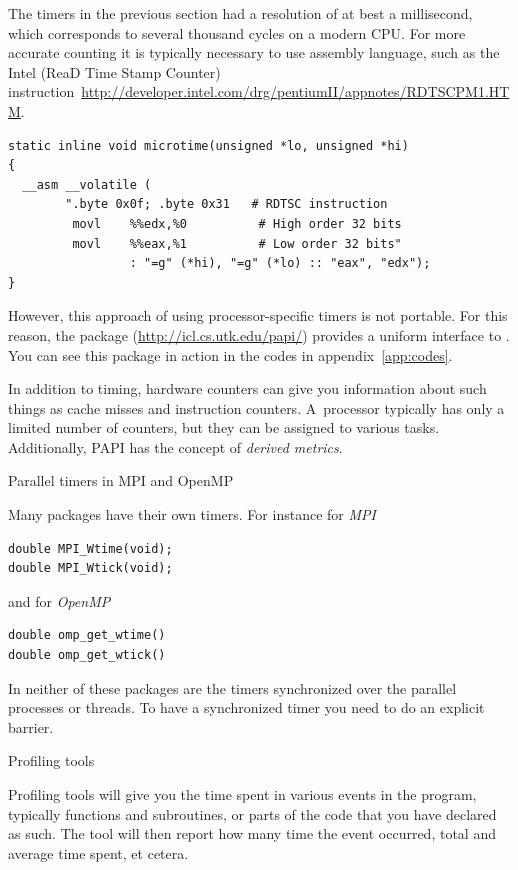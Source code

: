 The timers in the previous section had a resolution of at best a
millisecond, which corresponds to several thousand cycles on a modern
CPU. For more accurate counting it is typically necessary to use
assembly language, such as the Intel  (ReaD Time Stamp
Counter)
instruction~\url{http://developer.intel.com/drg/pentiumII/appnotes/RDTSCPM1.HTM}.
\begin{verbatim}
static inline void microtime(unsigned *lo, unsigned *hi)
{
  __asm __volatile (
        ".byte 0x0f; .byte 0x31   # RDTSC instruction
         movl    %%edx,%0          # High order 32 bits
         movl    %%eax,%1          # Low order 32 bits"
                 : "=g" (*hi), "=g" (*lo) :: "eax", "edx");
}                                                
\end{verbatim}
However,
this approach of using processor-specific timers is not portable. For
this reason, the  package (\url{http://icl.cs.utk.edu/papi/})
provides a uniform interface to .
You can see this package in action in the codes in
appendix~\ref{app:codes}.

In addition to timing, hardware counters can give you information about 
such things as cache misses and instruction counters. A~processor typically
has only a limited number of counters, but they can be assigned to various tasks.
Additionally, PAPI has the concept of \emph{derived metrics}.

 {Parallel timers in MPI and OpenMP}

Many packages have their own timers. For instance for
\emph{MPI}
\begin{verbatim}
double MPI_Wtime(void);
double MPI_Wtick(void);
\end{verbatim}
and for
\emph{OpenMP}
\begin{verbatim}
double omp_get_wtime()
double omp_get_wtick()
\end{verbatim}
In neither of these packages are the timers synchronized over the
parallel processes or threads. To have a synchronized timer you need
to do an explicit barrier.

 {Profiling tools}

Profiling tools will give you the time spent in various events in the
program, typically functions and subroutines, or parts of the code
that you have declared as such. The tool will then report how many
time the event occurred, total and average time spent, et cetera.

